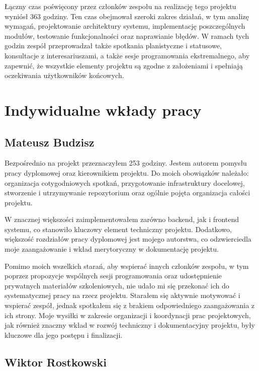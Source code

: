 Łączny czas poświęcony przez członków zespołu na realizację tego projektu wyniósł 363 godziny.
Ten czas obejmował szeroki zakres działań, w tym analizę wymagań, projektowanie architektury systemu, implementację poszczególnych modułów, testowanie funkcjonalności oraz naprawianie błędów.
W ramach tych godzin zespół przeprowadzał także spotkania planistyczne i statusowe, konsultacje z interesariuszami, a także sesje programowania ekstremalnego, aby zapewnić, że wszystkie elementy projektu są zgodne z założeniami i spełniają oczekiwania użytkowników końcowych.

\section{Indywidualne wkłady pracy}
\label{sec:indywidualne-wklady-pracy}

\subsection{Mateusz Budzisz}
\label{subsec:mateusz-budzisz}

Bezpośrednio na projekt przeznaczyłem 253 godziny.
Jestem autorem pomysłu pracy dyplomowej oraz kierownikiem projektu.
Do moich obowiązków należało: organizacja cotygodniowych spotkań, przygotowanie infrastruktury docelowej, stworzenie i utrzymywanie repozytorium oraz ogólnie pojęta organizacja całości projektu.

W znacznej większości zaimplementowałem zarówno backend, jak i frontend systemu, co stanowiło kluczowy element techniczny projektu.
Dodatkowo, większość rozdziałów pracy dyplomowej jest mojego autorstwa, co odzwierciedla moje zaangażowanie i wkład merytoryczny w dokumentację projektu.

Pomimo moich wszelkich starań, aby wspierać innych członków zespołu, w tym poprzez propozycje wspólnych sesji programowania oraz udostępnienie prywatnych materiałów szkoleniowych, nie udało mi się przekonać ich do systematycznej pracy na rzecz projektu.
Starałem się aktywnie motywować i wspierać zespół, jednak spotkałem się z brakiem odpowiedniego zaangażowania z ich strony.
Moje wysiłki w zakresie organizacji i koordynacji prac projektowych, jak również znaczny wkład w rozwój techniczny i dokumentacyjny projektu, były kluczowe dla jego postępu i finalizacji.

\subsection{Wiktor Rostkowski}
\label{subsec:wiktor-rostkowski}

